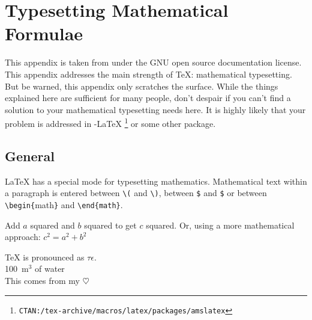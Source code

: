 
\chapter{Typesetting Mathematical Formulae}\label{math}
\begin{intro}
  This appendix is taken from \citet{ophs03} under the GNU open source documentation license. This appendix addresses the main strength
  of \TeX{}: mathematical typesetting. But be warned, this appendix
  only scratches the surface. While the things explained here are
  sufficient for many people, don't despair if you can't find a
  solution to your mathematical typesetting needs here. It is highly likely
  that your problem is addressed in \AmS-\LaTeX{}%
  \footnote{\texttt{CTAN:/tex-archive/macros/latex/packages/amslatex}}
  or some other package.
\end{intro}
  
\section{General}

\LaTeX{} has a special mode for typesetting mathematics.
Mathematical text within a paragraph is entered between \verb|\(|
and \verb|\)|, %
between \texttt{\$} and \texttt{\$} or between
\verb|\begin{|{math}\verb|}| and \verb|\end{math}|.

\begin{singlespace}
\begin{example}
Add $a$ squared and $b$ squared 
to get $c$ squared. Or, using 
a more mathematical approach:
$c^{2}=a^{2}+b^{2}$
\end{example}
\end{singlespace}

\begin{singlespace}
\begin{example}
\TeX{} is pronounced as 
$\tau\epsilon$.\\[6pt]
100~m$^{3}$ of water\\[6pt]
This comes from my $\heartsuit$
\end{example}
\end{singlespace}

